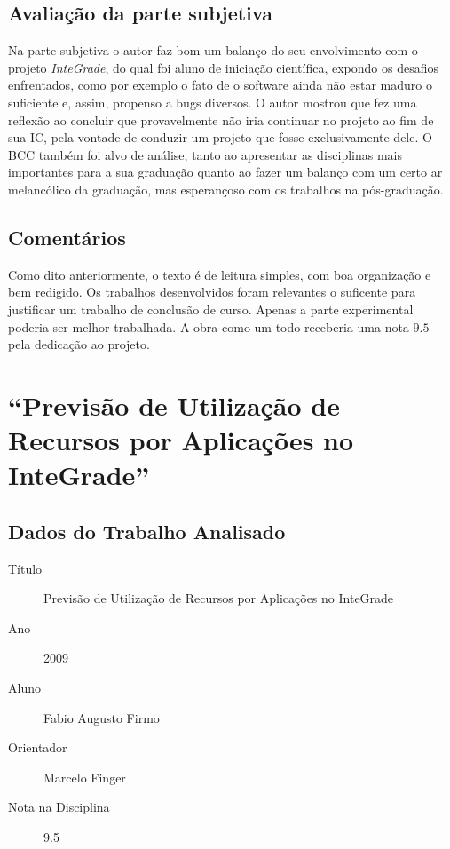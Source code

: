 \documentclass{article}
\begin{document}
	
\subsection{Avaliação da parte subjetiva}
	Na parte subjetiva o autor faz bom um balanço do seu envolvimento com o projeto \emph{InteGrade}, do qual foi aluno de iniciação científica, expondo os desafios enfrentados, como por exemplo o fato de o software ainda não estar maduro o suficiente e, assim, propenso a bugs diversos. O autor mostrou que fez uma reflexão ao concluir que provavelmente não iria continuar no projeto ao fim de sua IC, pela vontade de conduzir um projeto que fosse exclusivamente dele. O BCC também foi alvo de análise, tanto ao apresentar as disciplinas mais importantes para a sua graduação quanto ao fazer um balanço com um certo ar melancólico da graduação, mas esperançoso com os trabalhos na pós-graduação. 
	
\subsection{Comentários}
	Como dito anteriormente, o texto é de leitura simples, com boa organização e bem redigido. Os trabalhos desenvolvidos foram relevantes o suficente para justificar um trabalho de conclusão de curso. Apenas a parte experimental poderia ser melhor trabalhada. A obra como um todo receberia uma nota $9.5$ pela dedicação ao projeto.

\newpage

\section{``Previsão de Utilização de Recursos por Aplicações no InteGrade''}
\subsection{Dados do Trabalho Analisado}
	\begin{description}
		\item[Título] Previsão de Utilização de Recursos por Aplicações no InteGrade
		\item[Ano] 2009
		\item[Aluno] Fabio Augusto Firmo
		\item[Orientador] Marcelo Finger
		\item[Nota na Disciplina] 9.5
	\end{description}
\end{document}
